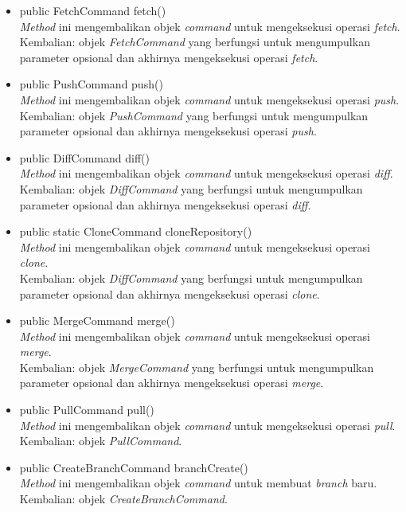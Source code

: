 \begin{itemize}
\item public FetchCommand fetch()\\
\textit{Method} ini mengembalikan objek \textit{command} untuk mengeksekusi operasi \textit{fetch}.\\
Kembalian: objek \textit{FetchCommand} yang berfungsi untuk mengumpulkan parameter opsional dan akhirnya mengeksekusi operasi \textit{fetch}.

\item public PushCommand push()\\
\textit{Method} ini mengembalikan objek \textit{command} untuk mengeksekusi operasi \textit{push}.\\
Kembalian: objek \textit{PushCommand} yang berfungsi untuk mengumpulkan parameter opsional dan akhirnya mengeksekusi operasi \textit{push}.

\item public DiffCommand diff()\\
\textit{Method} ini mengembalikan objek \textit{command} untuk mengeksekusi operasi \textit{diff}.\\
Kembalian: objek \textit{DiffCommand} yang berfungsi untuk mengumpulkan parameter opsional dan akhirnya mengeksekusi operasi \textit{diff}.

\item public static CloneCommand cloneRepository()\\
\textit{Method} ini mengembalikan objek \textit{command} untuk mengeksekusi operasi \textit{clone}.\\
Kembalian: objek \textit{DiffCommand} yang berfungsi untuk mengumpulkan parameter opsional dan akhirnya mengeksekusi operasi \textit{clone}.

\item public MergeCommand merge()\\
\textit{Method} ini mengembalikan objek \textit{command} untuk mengeksekusi operasi \textit{merge}.\\
Kembalian: objek \textit{MergeCommand} yang berfungsi untuk mengumpulkan parameter opsional dan akhirnya mengeksekusi operasi \textit{merge}.

\item public PullCommand pull()\\
\textit{Method} ini mengembalikan objek \textit{command} untuk mengeksekusi operasi \textit{pull}.\\
Kembalian: objek \textit{PullCommand}.

\item public CreateBranchCommand branchCreate()\\
\textit{Method} ini mengembalikan objek \textit{command} untuk membuat \textit{branch} baru.\\
Kembalian: objek \textit{CreateBranchCommand}.


\end{itemize}
